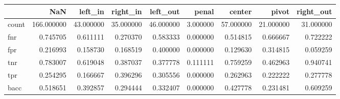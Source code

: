 \begin{tabular}{lrrrrrrrr}
\toprule
{} &         NaN &    left\_in &   right\_in &   left\_out &     penal &     center &      pivot &  right\_out \\
\midrule
count &  166.000000 &  43.000000 &  35.000000 &  46.000000 &  3.000000 &  57.000000 &  21.000000 &  31.000000 \\
fnr   &    0.745705 &   0.611111 &   0.270370 &   0.583333 &  0.000000 &   0.514815 &   0.666667 &   0.722222 \\
fpr   &    0.216993 &   0.158730 &   0.168519 &   0.400000 &  0.000000 &   0.129630 &   0.314815 &   0.059259 \\
tnr   &    0.783007 &   0.619048 &   0.387037 &   0.377778 &  0.111111 &   0.759259 &   0.462963 &   0.940741 \\
tpr   &    0.254295 &   0.166667 &   0.396296 &   0.305556 &  0.000000 &   0.262963 &   0.222222 &   0.277778 \\
bacc  &    0.518651 &   0.392857 &   0.294444 &   0.332407 &  0.000000 &   0.427778 &   0.231481 &   0.609259 \\
\bottomrule
\end{tabular}
